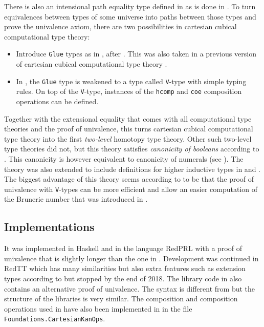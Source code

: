 \documentclass[12pt,a4paper,twoside,xetex]{book} %
\newcommand{\keyword}[1]{\emph{#1}\index{#1}}
\begin{document}
There is also an intensional path equality type defined in \cite{Angiuli2018} as 
is done in \cite{Huber2016}. To turn equivalences between types of some universe 
into paths between those types and prove the univalence axiom, there are two 
possibilities in cartesian cubical computational type theory:

\begin{itemize}
 \item Introduce \texttt{Glue} types as in , after 
\cite{Huber2016}. This was also taken in a previous version of cartesian cubical 
computational type theory \cite{Angiuli2017}.
 \item In \cite{Angiuli2018}, the \texttt{Glue} type is weakened to a type 
called \texttt{V}-type with simple typing rules. On top of the \texttt{V}-type, 
instances of the \texttt{hcomp} and \texttt{coe} composition operations can be 
defined.
\end{itemize}


Together with the extensional equality that comes with all computational type 
theories and the proof of univalence, this turns cartesian cubical computational 
type theory into the first \keyword{two-level} homotopy type theory. Other such 
two-level type theories did not, but this theory satisfies \keyword{canonicity 
of booleans} according to \cite{Angiuli2018}. This canonicity is however 
equivalent to canonicity of numerals (see ). The theory was 
also extended to include definitions for higher inductive types in 
\cite{CavHar18} and \cite{CaHa19}. The biggest advantage of this theory seems 
according to \cite{Moertberg2018Bonn} to be that the proof of univalence with 
\texttt{V}-types can be more efficient and allow an easier computation of the 
Brunerie number that was introduced in .

\subsection{Implementations}

It was implemented in Haskell \cite{MorAng18} and in the language RedPRL 
\cite{Sterling2018a} with a proof of univalence that is slightly longer than the 
one in \cite{Moertberg2018}. Development was continued in RedTT 
\cite{Sterling2018b} which has many similarities but also extra features such as 
extension types according to \cite{Moertberg2018a} but stopped by the end of 
2018. The library code in \cite{Sterling2018b} also contains an alternative 
proof of univalence. The syntax is different from \cite{Moertberg2018} but the 
structure of the libraries is very similar. The composition and composition 
operations used in \cite{Sterling2018b} have also been implemented in 
\cite{Moertberg2018} in the file \texttt{Foundations.CartesianKanOps}. 
\end{document}
